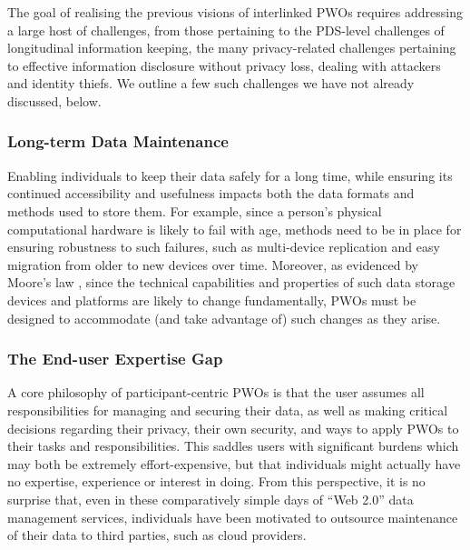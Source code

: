 \documentclass[letterpaper]{sig-alternate}
\begin{document}


The goal of realising the previous visions of interlinked PWOs requires addressing a large host of challenges, from those pertaining to the PDS-level challenges of longitudinal information keeping, the many privacy-related challenges pertaining to effective information disclosure without privacy loss, dealing with attackers and identity thiefs.  We outline a few such challenges we have not already discussed, below.

\subsubsection{Long-term Data Maintenance}

Enabling individuals to keep their data safely for a long time, while ensuring its continued accessibility and usefulness impacts both the data formats and methods used to store them.  For example, since a person's physical computational hardware is likely to fail with age, methods need to be in place for ensuring robustness to such failures, such as multi-device replication and easy migration from older to new devices over time.   Moreover, as evidenced by Moore's law \cite{schaller1997moore}, since the technical capabilities and properties of such data storage devices and platforms are likely to change fundamentally, PWOs must be designed to accommodate (and take advantage of) such changes as they arise. 

\subsubsection{The End-user Expertise Gap}

A core philosophy of participant-centric PWOs is that the user assumes all responsibilities for managing and securing their data, as well as making critical decisions regarding their privacy, their own security, and ways to apply PWOs to their tasks and responsibilities.  This saddles users with significant burdens which may both be extremely effort-expensive, but that individuals might actually have no expertise, experience or interest in doing.  From this perspective, it is no surprise that, even in these comparatively simple days of ``Web 2.0'' data management services, individuals have been motivated to outsource maintenance of their data to third parties, such as cloud providers. 
\end{document}
